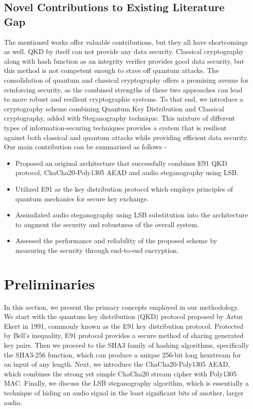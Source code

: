 \documentclass[a4paper]{cas-sc}
\begin{document}
\subsection{Novel Contributions to Existing Literature Gap}
The mentioned works offer valuable contributions, but they all have shortcomings as well. QKD by itself can not
provide any data security. Classical cryptography along with hash function as an integrity verifier provides good data
security, but this method is not competent enough to stave off quantum attacks. The consolidation of quantum
and classical cryptography offers a promising avenue for reinforcing security, as the combined strengths of these two
approaches can lead to more robust and resilient cryptographic systems. To that end, we introduce a cryptography
scheme combining Quantum Key Distribution and Classical cryptography, added with Steganography technique. This
mixture of different types of information-securing techniques provides a system that is resilient against both classical
and quantum attacks while providing efficient data security.   Our main contribution can be summarized as follows -
\begin{itemize}
    \item Proposed an original architecture that successfully combines E91 QKD protocol, ChaCha20-Poly1305 AEAD and audio steganography using LSB.
    \item Utilized E91 as the key distribution protocol which employs principles of quantum mechanics for secure key exchange.
    \item Assimilated audio steganography using LSB substitution into the architecture to augment the security and robustness of the overall system.
    \item Assessed the performance and reliability of the proposed scheme by measuring the security through end-to-end encryption.
\end{itemize}
\section{Preliminaries}
\label{sec:preliminaries}
In this section, we present the primary concepts employed in our methodology. We start with the quantum key distribution (QKD) protocol proposed by Artur Ekert in 1991, commonly known as the E91 key distribution protocol. Protected by Bell's inequality, E91 protocol provides a secure method of sharing generated key pairs. Then we proceed to the SHA3 family of hashing algorithms, specifically the SHA3-256 function, which can produce a unique 256-bit long hexstream for an input of any length. Next, we introduce the ChaCha20-Poly1305 AEAD, which combines the strong yet simple ChaCha20 stream cipher with Poly1305 MAC. Finally, we discuss the LSB steganography algorithm, which is essentially a technique of hiding an audio signal in the least significant bits of another, larger audio.
\end{document}
